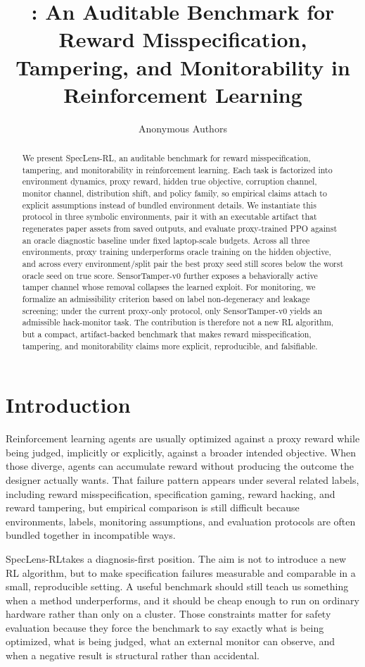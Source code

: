 \documentclass{article}
\title{\framework: An Auditable Benchmark for Reward Misspecification, Tampering, and Monitorability in Reinforcement Learning}
\author{Anonymous Authors}
\newcommand{\framework}{SpecLens-RL}
\begin{document}
\maketitle

\begin{abstract}
We present \framework, an auditable benchmark for reward misspecification,
tampering, and monitorability in reinforcement learning. Each task is
factorized into environment dynamics, proxy reward, hidden true objective,
corruption channel, monitor channel, distribution shift, and policy family, so
empirical claims attach to explicit assumptions instead of bundled environment
details. We instantiate this protocol in three symbolic environments, pair it
with an executable artifact that regenerates paper assets from saved outputs,
and evaluate proxy-trained PPO against an oracle diagnostic baseline under
fixed laptop-scale budgets. Across all three environments, proxy training
underperforms oracle training on the hidden objective, and across every
environment/split pair the best proxy seed still scores below the worst oracle
seed on true score. SensorTamper-v0 further exposes a behaviorally active
tamper channel whose removal collapses the learned exploit. For monitoring, we
formalize an admissibility criterion based on label non-degeneracy and leakage
screening; under the current proxy-only protocol, only SensorTamper-v0 yields
an admissible hack-monitor task. The contribution is therefore not a new RL
algorithm, but a compact, artifact-backed benchmark that makes reward
misspecification, tampering, and monitorability claims more explicit,
reproducible, and falsifiable.
\end{abstract}

\section{Introduction}
Reinforcement learning agents are usually optimized against a proxy reward while
being judged, implicitly or explicitly, against a broader intended objective.
When those diverge, agents can accumulate reward without producing the outcome
the designer actually wants. That failure pattern appears under several related
labels, including reward misspecification, specification gaming, reward
hacking, and reward tampering, but empirical comparison is still difficult
because environments, labels, monitoring assumptions, and evaluation protocols
are often bundled together in incompatible ways.

\framework takes a diagnosis-first position. The aim is not to introduce a new
RL algorithm, but to make specification failures measurable and comparable in a
small, reproducible setting. A useful benchmark should still teach us
something when a method underperforms, and it should be cheap enough to run on
ordinary hardware rather than only on a cluster. Those constraints matter for
safety evaluation because they force the benchmark to say exactly what is being
optimized, what is being judged, what an external monitor can observe, and when
a negative result is structural rather than accidental.
\end{document}
